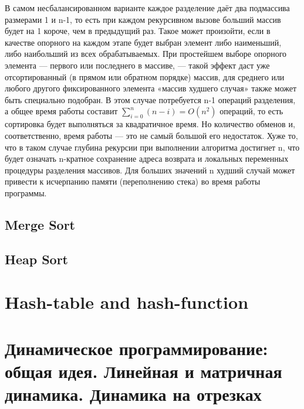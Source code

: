 \documentclass[a4paper]{article}
\begin{document}
\begin{itemize}
В самом несбалансированном варианте каждое разделение даёт два подмассива размерами 1 и n-1, то есть при каждом рекурсивном вызове больший массив будет на 1 короче, чем в предыдущий раз. Такое может произойти, если в качестве опорного на каждом этапе будет выбран элемент либо наименьший, либо наибольший из всех обрабатываемых. При простейшем выборе опорного элемента — первого или последнего в массиве, — такой эффект даст уже отсортированный (в прямом или обратном порядке) массив, для среднего или любого другого фиксированного элемента «массив худшего случая» также может быть специально подобран. В этом случае потребуется n-1 операций разделения, а общее время работы составит $\sum_{i=0}^n (n-i) = O(n^2)$ операций, то есть сортировка будет выполняться за квадратичное время. Но количество обменов и, соответственно, время работы — это не самый большой его недостаток. Хуже то, что в таком случае глубина рекурсии при выполнении алгоритма достигнет n, что будет означать n-кратное сохранение адреса возврата и локальных переменных процедуры разделения массивов. Для больших значений n худший случай может привести к исчерпанию памяти (переполнению стека) во время работы программы.

\end{itemize}


\subsection{Merge Sort}
\subsection{Heap Sort}

\section{Hash-table and hash-function}

\section{Динамическое программирование: общая идея. Линейная и матричная динамика. Динамика на отрезках}
\end{document}
